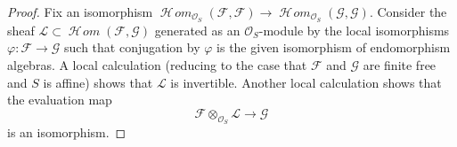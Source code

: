 \documentclass[10pt,a4paper]{amsart}
\theoremstyle{plain}
\theoremstyle{definition}
\theoremstyle{remark}
\numberwithin{equation}{subsection}
\def\SheafHom{\mathop{\mathcal{H}\!\mathit{om}}\nolimits}
\begin{document}
\begin{proof}
Fix an isomorphism
$\SheafHom_{\mathcal{O}_S}(\mathcal{F}, \mathcal{F}) \to
\SheafHom_{\mathcal{O}_S}(\mathcal{G}, \mathcal{G})$.
Consider the sheaf $\mathcal{L} \subset \SheafHom(\mathcal{F}, \mathcal{G})$
generated as an $\mathcal{O}_S$-module by the local isomorphisms
$\varphi : \mathcal{F} \to \mathcal{G}$ such that conjugation by
$\varphi$ is the given isomorphism of endomorphism algebras.
A local calculation (reducing to the case that $\mathcal{F}$ and $\mathcal{G}$
are finite free and $S$ is affine) shows that $\mathcal{L}$ is invertible.
Another local calculation shows that the evaluation map
$$
\mathcal{F} \otimes_{\mathcal{O}_S} \mathcal{L} \longrightarrow \mathcal{G}
$$
is an isomorphism.
\end{proof}
\end{document}

